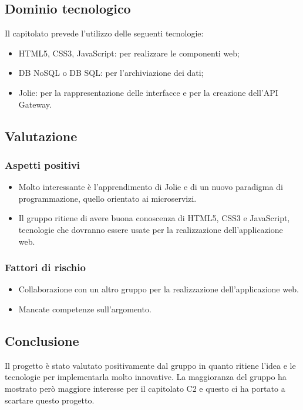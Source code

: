 	\subsection {Dominio tecnologico}
		Il capitolato prevede l'utilizzo delle seguenti tecnologie:
		\begin {itemize}
			\item HTML5, CSS3, JavaScript: per realizzare le componenti web;
			\item DB NoSQL o DB SQL: per l'archiviazione dei dati;
			\item Jolie: per la rappresentazione delle interfacce e per la creazione dell'API Gateway.
		\end {itemize}
	\subsection {Valutazione}
		\subsubsection {Aspetti positivi}
			\begin{itemize}
				\item Molto interessante è l'apprendimento di Jolie e di un nuovo paradigma di programmazione, quello orientato ai microservizi.
				\item Il gruppo ritiene di avere buona conoscenza di HTML5, CSS3 e JavaScript, tecnologie che dovranno essere usate per la realizzazione dell'applicazione web.
			\end{itemize}
		\subsubsection {Fattori di rischio}
			\begin{itemize}
				\item Collaborazione con un altro gruppo per la realizzazione dell'applicazione web.
				\item Mancate competenze sull'argomento.
			\end{itemize}
	\subsection {Conclusione}
		Il progetto è stato valutato positivamente dal gruppo in quanto ritiene l'idea e le tecnologie per implementarla molto innovative. La maggioranza del gruppo ha mostrato però maggiore interesse
		per il capitolato C2 e questo ci ha portato a scartare questo progetto.